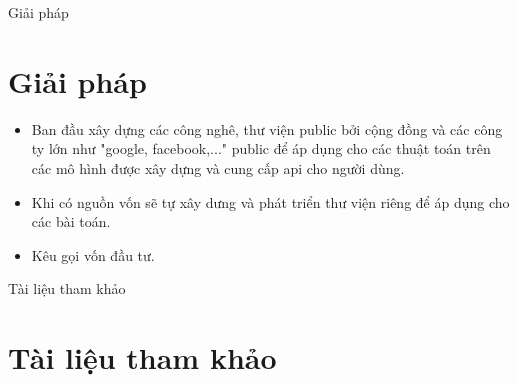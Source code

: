 \documentclass{beamer}
\begin{document}
\begin{frame}{Giải pháp}
\section{Giải pháp}
\begin{itemize}
\item Ban đầu xây dựng các công nghê, thư viện public bởi cộng đồng và các công ty lớn như "google, facebook,..." public để áp dụng cho các thuật toán trên các mô hình được xây dựng và cung cấp api cho người dùng.
\item Khi có nguồn vốn sẽ tự xây dưng và phát triển thư viện riêng để áp dụng cho các bài toán.
\item Kêu gọi vốn đầu tư.
\end{itemize}
\end{frame}
\begin{frame}{Tài liệu tham khảo}
\section*{Tài liệu tham khảo}

\end{frame}
\end{document}
